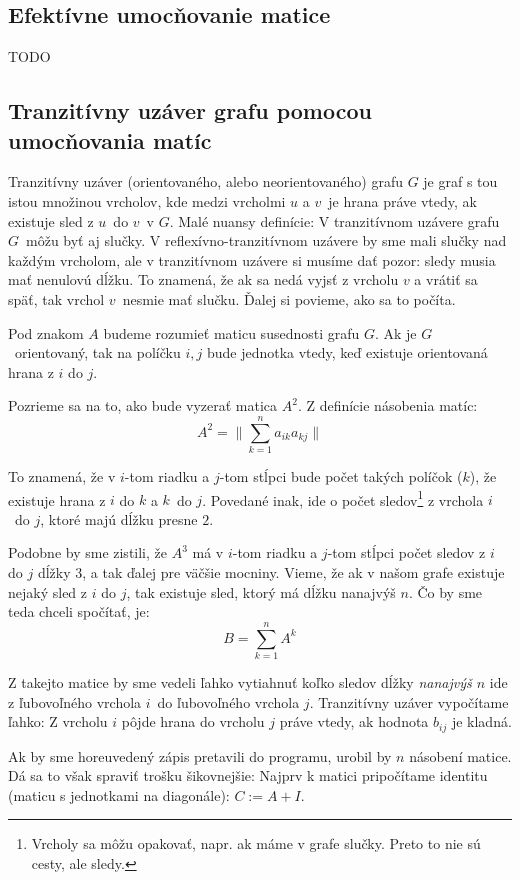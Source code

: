 	\subsection{Efektívne umocňovanie matice} TODO
	\subsection{Tranzitívny uzáver grafu pomocou umocňovania matíc}
        Tranzitívny uzáver (orientovaného, alebo neorientovaného) grafu $G$ je graf s tou istou množinou vrcholov,
        kde medzi vrcholmi $u$ a $v$ je hrana práve vtedy, ak existuje sled z $u$ do $v$ v $G$. Malé nuansy definície:
        V tranzitívnom uzávere grafu $G$ môžu byť aj slučky. V reflexívno-tranzitívnom uzávere by sme mali slučky nad
        každým vrcholom, ale v tranzitívnom uzávere si musíme dať pozor: sledy musia mať nenulovú dĺžku. To znamená, že
        ak sa nedá vyjsť z vrcholu $v$ a vrátiť sa späť, tak vrchol $v$ nesmie mať slučku. Ďalej si povieme,
        ako sa to počíta.

        Pod znakom $A$ budeme rozumieť maticu susednosti grafu $G$. Ak je $G$ orientovaný, tak na políčku $i,j$ bude
        jednotka vtedy, keď existuje orientovaná hrana z $i$ do $j$.

        Pozrieme sa na to, ako bude vyzerať matica $A^2$. Z definície násobenia matíc:
        $$ A^2 = \| \sum_{k=1}^n a_{ik}a_{kj} \| $$

        To znamená, že v $i$-tom riadku a $j$-tom stĺpci bude počet takých políčok ($k$), že existuje hrana z $i$
        do $k$ a $k$ do $j$. Povedané inak, ide o počet sledov\footnote{Vrcholy sa môžu opakovať, napr. ak máme v grafe
        slučky. Preto to nie sú cesty, ale sledy.} z vrchola $i$ do $j$, ktoré majú dĺžku presne $2$.

        Podobne by sme zistili, že $A^3$ má v $i$-tom riadku a $j$-tom stĺpci počet sledov z $i$ do $j$
        dĺžky $3$, a tak ďalej pre väčšie mocniny. Vieme, že ak v našom grafe existuje nejaký sled z $i$
        do $j$, tak existuje sled, ktorý má dĺžku nanajvýš $n$. Čo by sme teda chceli spočítať, je:
        $$ B = \sum_{k=1}^{n} A^k $$

        Z takejto matice by sme vedeli ľahko vytiahnuť koľko sledov dĺžky \emph{nanajvýš $n$} ide z ľubovoľného
        vrchola $i$ do ľubovoľného vrchola $j$. Tranzitívny uzáver vypočítame ľahko:
        Z vrcholu $i$ pôjde hrana do vrcholu $j$ práve vtedy, ak hodnota $b_{ij}$ je kladná.

        Ak by sme horeuvedený zápis pretavili do programu, urobil by $n$ násobení matice. Dá sa to však spraviť
        trošku šikovnejšie: Najprv k matici pripočítame identitu (maticu s jednotkami na diagonále): $C := A + I$.
        

